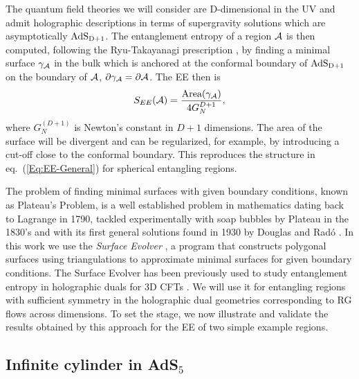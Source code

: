 \documentclass[11 pt]{article}
\begin{document}
The quantum field theories we will consider are D-dimensional in the UV and admit holographic descriptions in terms of supergravity solutions which are asymptotically $\rm AdS_{D+1}$. The entanglement entropy of a region $\cal A$ is then computed, following the Ryu-Takayanagi prescription \cite{Ryu:2006bv,Ryu:2006ef,Nishioka:2009un}, by finding a minimal surface $\gamma_{\cal A}$ in the bulk which is anchored at the conformal boundary of $\rm AdS_{D+1}$ on the boundary of $\cal A$, $\partial \gamma_{\cal A}=\partial\cal A$. The EE then is 
\begin{equation}
    S_{EE}({\cal A}) = \frac{\text{Area}(\gamma_{\cal A})}{4G_N^{D+1}},
\end{equation}
where $G_N^{(D+1)}$ is Newton's constant in $D+1$ dimensions. The area of the surface will be divergent and can be regularized, for example, by introducing a cut-off close to the conformal boundary.
This reproduces the structure in eq.~(\ref{Eq:EE-General}) for spherical entangling regions.

The problem of finding minimal surfaces with given boundary conditions, known as Plateau's Problem, is a well established problem in mathematics dating back to Lagrange in 1790, tackled experimentally with soap bubbles by Plateau in the 1830's and with its first general solutions found in 1930 by Douglas \cite{10.2307/1989472} and Rad\'o \cite{10.2307/1968237}. In this work we use the \textit{Surface Evolver} \cite{Brakke,Brakke1992}, a program that constructs polygonal surfaces using triangulations to approximate minimal surfaces for given boundary conditions. The Surface Evolver has been previously used to study entanglement entropy in holographic duals for 3D CFTs \cite{Fonda2015,Seminara2017}. We will use it for entangling regions with sufficient symmetry in the holographic dual geometries corresponding to RG flows across dimensions. To set the stage, we now illustrate and validate the results obtained by this approach for the EE of two simple example regions.

\subsection{Infinite cylinder in AdS$_5$} \label{sec:inf_cylinder}
\end{document}
